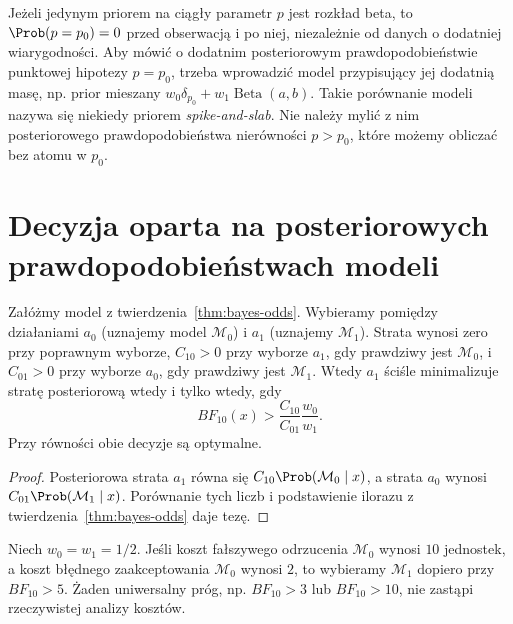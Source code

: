 \begin{uwaga}
Jeżeli jedynym priorem na ciągły parametr $p$ jest rozkład
beta, to $\Prob(p=p_0)=0$ przed obserwacją i po niej,
niezależnie od danych o dodatniej wiarygodności.
Aby mówić o dodatnim posteriorowym prawdopodobieństwie
punktowej hipotezy $p=p_0$, trzeba wprowadzić model
przypisujący jej dodatnią masę, np. prior mieszany
$w_0\delta_{p_0}+w_1\operatorname{Beta}(a,b)$.
Takie porównanie modeli nazywa się niekiedy priorem
\emph{spike-and-slab}. Nie należy mylić z nim posteriorowego
prawdopodobieństwa nierówności $p>p_0$, które możemy obliczać
bez atomu w $p_0$.
\end{uwaga}

\section{Decyzja oparta na posteriorowych prawdopodobieństwach modeli}
\begin{twierdzenie}
\label{thm:bayes-hypothesis-decision}
Załóżmy model z twierdzenia~\ref{thm:bayes-odds}.
Wybieramy pomiędzy działaniami $a_0$ (uznajemy model
$\mathcal M_0$) i $a_1$ (uznajemy $\mathcal M_1$).
Strata wynosi zero przy poprawnym wyborze,
$C_{10}>0$ przy wyborze $a_1$, gdy prawdziwy jest
$\mathcal M_0$, i $C_{01}>0$ przy wyborze $a_0$,
gdy prawdziwy jest $\mathcal M_1$. Wtedy $a_1$
ściśle minimalizuje stratę posteriorową wtedy i tylko wtedy, gdy
\[
 BF_{10}(x)>\frac{C_{10}}{C_{01}}\frac{w_0}{w_1}.
\]
Przy równości obie decyzje są optymalne.
\end{twierdzenie}
\begin{proof}
Posteriorowa strata $a_1$ równa się
$C_{10}\Prob(\mathcal M_0\mid x)$, a strata $a_0$ wynosi
$C_{01}\Prob(\mathcal M_1\mid x)$.
Porównanie tych liczb i podstawienie ilorazu z
 twierdzenia~\ref{thm:bayes-odds} daje tezę.
\end{proof}

\begin{przyklad}
Niech $w_0=w_1=1/2$. Jeśli koszt fałszywego odrzucenia
$\mathcal M_0$ wynosi $10$ jednostek, a koszt błędnego
zaakceptowania $\mathcal M_0$ wynosi $2$, to wybieramy
$\mathcal M_1$ dopiero przy $BF_{10}>5$.
Żaden uniwersalny próg, np. $BF_{10}>3$ lub $BF_{10}>10$,
nie zastąpi rzeczywistej analizy kosztów.
\end{przyklad}

